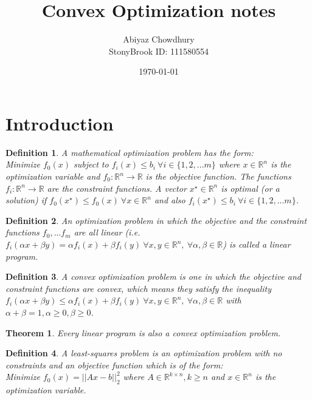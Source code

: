 \documentclass[a4paper]{article}
\title{\textbf{Convex Optimization notes}}
\author{Abiyaz Chowdhury \\ StonyBrook ID: 111580554}
\date{\today}
\newtheorem{mytheorem}{Theorem}
\newtheorem{mydef}{Definition}
\numberwithin{mytheorem}{section}
\numberwithin{mydef}{section}
\numberwithin{example}{section}
\begin{document}
\maketitle

\section{Introduction}

\begin{mydef} A mathematical optimization problem has the form: \\ Minimize $f_{0}(x)$ subject to $f_{i}(x) \leq b_{i} \ \forall i \in \{1,2,...m\}$  where $x \in \mathbb{R}^{n}$ is the optimization variable and $f_{0} : \mathbb{R}^{n} \rightarrow \mathbb{R}$ is the objective function. The functions $f_{i}: \mathbb{R}^{n} \rightarrow \mathbb{R}$ are the constraint functions. A vector $x^{\star} \in \mathbb{R}^{n}$ is optimal (or a solution) if $f_{0}(x^{\star}) \leq f_{0}(x) \ \forall x \in \mathbb{R}^{n}$ and also $f_{i}(x^{\star}) \leq b_{i} \ \forall i \in \{1,2,...m\}$. 
\end{mydef}

\begin{mydef} An optimization problem in which the objective and the constraint functions $f_{0},...f_{m}$ are all linear (i.e. $f_{i}(\alpha x + \beta y) = \alpha f_{i}(x) + \beta f_{i}(y) \ \forall x,y \in \mathbb{R}^{n}, \ \forall \alpha,\beta \in \mathbb{R}$) is called a linear program.
\end{mydef}

\begin{mydef} A convex optimization problem is one in which the objective and constraint functions are convex, which means they satisfy the inequality $f_{i}(\alpha x + \beta y) \leq \alpha f_{i}(x) + \beta f_{i}(y) \ \forall x,y \in \mathbb{R}^{n}, \ \forall \alpha,\beta \in \mathbb{R}$ with $\alpha + \beta = 1, \alpha \geq 0, \beta \geq 0$.
\end{mydef}

\begin{mytheorem} Every linear program is also a convex optimization problem. \end{mytheorem}

\begin{mydef} A least-squares problem is an optimization problem with no constraints and an objective function which is of the form: \\
Minimize $f_{0}(x) = ||Ax - b|| ^{2}_{2}$ where $A \in \mathbb{R}^{k \times n}, k \geq n$ and $x \in \mathbb{R}^{n}$ is the optimization variable.
\end{mydef}
\end{document}
